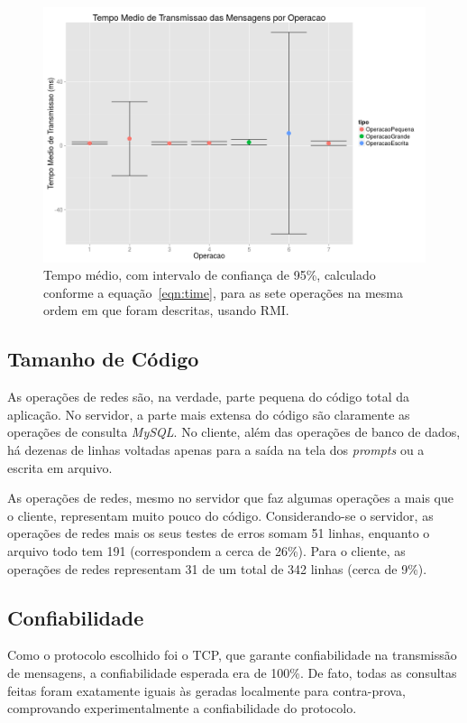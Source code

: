 \documentclass[12pt,a4paper]{article}
\begin{document}
\begin{figure}[h]
\centering
\includegraphics[width=\textwidth]{resultadosTempoTransmissaoRMI.png}
\caption{Tempo médio, com intervalo de confiança de 95\%, calculado conforme a equação~\ref{eqn:time}, para as sete operações na mesma ordem em que foram descritas, usando RMI.}
\label{fig:transmissao}
\end{figure}

\subsection{Tamanho de Código}
As operações de redes são, na verdade, parte pequena do código total da aplicação. No servidor, a parte mais extensa do código são claramente as operações de consulta {\it MySQL}. No cliente, além das operações de banco de dados, há dezenas de linhas voltadas apenas para a saída na tela dos {\it prompts} ou a escrita em arquivo.

As operações de redes, mesmo no servidor que faz algumas operações a mais que o cliente, representam muito pouco do código. Considerando-se o servidor, as operações de redes mais os seus testes de erros somam 51 linhas, enquanto o arquivo todo tem 191 (correspondem a cerca de 26\%). Para o cliente, as operações de redes representam 31 de um total de 342 linhas (cerca de 9\%). 

\subsection{Confiabilidade}

Como o protocolo escolhido foi o TCP, que garante confiabilidade na transmissão de mensagens, a confiabilidade esperada era de 100\%. De fato, todas as consultas feitas foram exatamente iguais às geradas localmente para contra-prova, comprovando experimentalmente a confiabilidade do protocolo.
\end{document}
